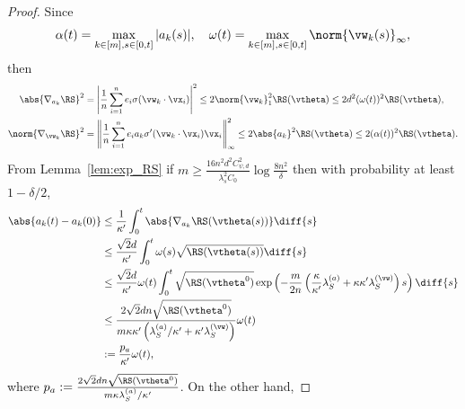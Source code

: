 \documentclass{article}
\begin{document}
\begin{proof}
    Since
    \begin{equation}
        \alpha(t)=\max\limits_{k\in[m],s\in[0,t]}|a_k(s)|, \quad \omega(t)=\max\limits_{k\in[m],s\in[0,t]}\norm{\vw_k(s)}_{\infty},
    \end{equation}
    then
    \begin{equation}
        \begin{aligned}
            \abs{\nabla_{a_k}\RS}^2    & =\left\lvert\frac{1}{n}\sum_{i=1}^n e_i\sigma(\vw_k\cdot\vx_i)\right\rvert^2\leq 2\norm{\vw_k}^2_1\RS(\vtheta)\leq 2d^2(\omega(t))^2\RS(\vtheta),            \\
            \norm{\nabla_{\vw_k}\RS}^2 & =\left\lVert\frac{1}{n}\sum_{i=1}^n e_i a_k\sigma'(\vw_k\cdot\vx_i)\vx_i\right\rVert^2_{\infty}\leq 2\abs{a_k}^2\RS(\vtheta)\leq 2(\alpha(t))^2\RS(\vtheta).
        \end{aligned}
    \end{equation}
    From Lemma~\ref{lem:exp_RS} if $m\geq \frac{16n^2d^2C_{\psi,d}^2}{\lambda_s^2C_0}\log\frac{8n^2}{\delta}$ then with probability at least $1 - \delta/2$,
    \begin{equation}
        \begin{aligned}
            \abs{a_k(t) - a_k(0)}
             & \leq\frac{1}{\kappa'}\int_0^t\abs{\nabla_{a_k}\RS(\vtheta(s))}\diff{s}                                                                                                                          \\
             & \leq\frac{\sqrt{2}d}{\kappa'}\int_{0}^{t} \omega(s)\sqrt{\RS(\vtheta(s))}\diff{s}                                                                                                               \\
             & \leq\frac{\sqrt{2}d}{\kappa'}\omega(t)\int_{0}^{t}\sqrt{\RS(\vtheta^0)}\exp\left(-\frac{m}{2n}\left(\frac{\kappa}{\kappa'}\lambda_S^{(a)}+\kappa\kappa'\lambda_S^{(\vw)}\right)s\right)\diff{s} \\
             & \leq \frac{2\sqrt{2}dn\sqrt{\RS(\vtheta^0)}}{m\kappa\kappa'\left(\lambda^{(a)}_S/\kappa'+\kappa'\lambda_S^{(\vw)}\right)}\omega(t)                                                              \\
             & :=\frac{p_a}{\kappa'}\omega(t),
        \end{aligned}
    \end{equation}
    where $p_a := \frac{2\sqrt{2}dn\sqrt{\RS(\vtheta^0)}}{m\kappa\lambda_S^{(a)}/\kappa'}$. On the other hand,

\end{proof}
\end{document}
